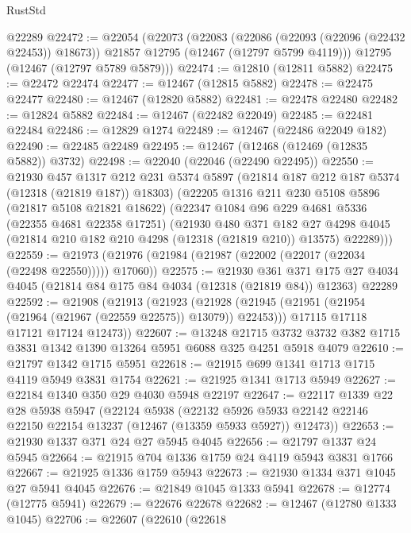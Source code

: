 \begin{lexlean}{RustStd}
\begin{coremodule}
    @22289
@22472 := @22054
    (@22073
      (@22083
        (@22086 (@22093 (@22096 (@22432 @22453)) @18673))
        @21857
        @12795
        (@12467 (@12797 @5799 @4119)))
      @12795
      (@12467 (@12797 @5789 @5879)))
@22474 := @12810 (@12811 @5882)
@22475 := @22472 @22474
@22477 := @12467 (@12815 @5882)
@22478 := @22475 @22477
@22480 := @12467 (@12820 @5882)
@22481 := @22478 @22480
@22482 := @12824 @5882
@22484 := @12467 (@22482 @22049)
@22485 := @22481 @22484
@22486 := @12829 @1274
@22489 := @12467 (@22486 @22049 @182)
@22490 := @22485 @22489
@22495 := @12467 (@12468 (@12469 (@12835 @5882)) @3732)
@22498 := @22040 (@22046 (@22490 @22495))
@22550 := @21930
    @457
    @1317
    @212
    @231
    @5374
    @5897
    (@21814 @187 @212 @187 @5374 (@12318 (@21819 @187)) @18303)
    (@22205
      @1316
      @211
      @230
      @5108
      @5896
      (@21817 @5108 @21821 @18622)
      (@22347
        @1084
        @96
        @229
        @4681
        @5336
        (@22355 @4681 @22358 @17251)
        (@21930
          @480
          @371
          @182
          @27
          @4298
          @4045
          (@21814 @210 @182 @210 @4298 (@12318 (@21819 @210)) @13575)
          @22289)))
@22559 := @21973 (@21976 (@21984 (@21987 (@22002 (@22017 (@22034 (@22498 @22550))))) @17060))
@22575 := @21930
    @361
    @371
    @175
    @27
    @4034
    @4045
    (@21814 @84 @175 @84 @4034 (@12318 (@21819 @84)) @12363)
    @22289
@22592 := @21908
    (@21913
      (@21923
        (@21928 (@21945 (@21951 (@21954 (@21964 (@21967 (@22559 @22575)) @13079)) @22453)))
        @17115
        @17118
        @17121
        @17124
        @12473))
@22607 := @13248
    @21715
    @3732
    @3732
    @382
    @1715
    @3831
    @1342
    @1390
    @13264
    @5951
    @6088
    @325
    @4251
    @5918
    @4079
@22610 := @21797 @1342 @1715 @5951
@22618 := @21915 @699 @1341 @1713 @1715 @4119 @5949 @3831 @1754
@22621 := @21925 @1341 @1713 @5949
@22627 := @22184 @1340 @350 @29 @4030 @5948 @22197
@22647 := @22117
    @1339
    @22
    @28
    @5938
    @5947
    (@22124
      @5938
      (@22132 @5926 @5933 @22142 @22146 @22150 @22154 @13237 (@12467 (@13359 @5933 @5927)) @12473))
@22653 := @21930 @1337 @371 @24 @27 @5945 @4045
@22656 := @21797 @1337 @24 @5945
@22664 := @21915 @704 @1336 @1759 @24 @4119 @5943 @3831 @1766
@22667 := @21925 @1336 @1759 @5943
@22673 := @21930 @1334 @371 @1045 @27 @5941 @4045
@22676 := @21849 @1045 @1333 @5941
@22678 := @12774 (@12775 @5941)
@22679 := @22676 @22678
@22682 := @12467 (@12780 @1333 @1045)
@22706 := @22607
    (@22610
      (@22618

\end{coremodule}
\end{lexlean}
